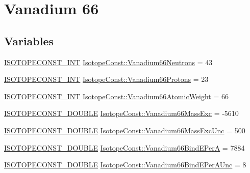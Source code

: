 \hypertarget{group___isotope_const-_vanadium-_v66}{}\section{Vanadium 66}
\label{group___isotope_const-_vanadium-_v66}
\subsection*{Variables}
\begin{DoxyCompactItemize}
\item 
\mbox{\hyperlink{group___isotope_const-_macros_ga5f18360b3e99483a35c32d789e62621c}{I\+S\+O\+T\+O\+P\+E\+C\+O\+N\+S\+T\+\_\+\+I\+NT}} \mbox{\hyperlink{group___isotope_const-_vanadium-_v66_ga191a0f33845293c272da14841b084d69}{Isotope\+Const\+::\+Vanadium66\+Neutrons}} = 43
\item 
\mbox{\hyperlink{group___isotope_const-_macros_ga5f18360b3e99483a35c32d789e62621c}{I\+S\+O\+T\+O\+P\+E\+C\+O\+N\+S\+T\+\_\+\+I\+NT}} \mbox{\hyperlink{group___isotope_const-_vanadium-_v66_ga18873adb59a7c3400b8dd6fa83fe769a}{Isotope\+Const\+::\+Vanadium66\+Protons}} = 23
\item 
\mbox{\hyperlink{group___isotope_const-_macros_ga5f18360b3e99483a35c32d789e62621c}{I\+S\+O\+T\+O\+P\+E\+C\+O\+N\+S\+T\+\_\+\+I\+NT}} \mbox{\hyperlink{group___isotope_const-_vanadium-_v66_ga159e5003c881723cec389aa0dbca0256}{Isotope\+Const\+::\+Vanadium66\+Atomic\+Weight}} = 66
\item 
\mbox{\hyperlink{group___isotope_const-_macros_ga8f45a7272ce02c0b4c65c44636ed719a}{I\+S\+O\+T\+O\+P\+E\+C\+O\+N\+S\+T\+\_\+\+D\+O\+U\+B\+LE}} \mbox{\hyperlink{group___isotope_const-_vanadium-_v66_ga17f347c21fdc927da5c9b33f49a1c058}{Isotope\+Const\+::\+Vanadium66\+Mass\+Exc}} = -\/5610
\item 
\mbox{\hyperlink{group___isotope_const-_macros_ga8f45a7272ce02c0b4c65c44636ed719a}{I\+S\+O\+T\+O\+P\+E\+C\+O\+N\+S\+T\+\_\+\+D\+O\+U\+B\+LE}} \mbox{\hyperlink{group___isotope_const-_vanadium-_v66_gaab204bb017b4d66e0c43c6588fad08dd}{Isotope\+Const\+::\+Vanadium66\+Mass\+Exc\+Unc}} = 500
\item 
\mbox{\hyperlink{group___isotope_const-_macros_ga8f45a7272ce02c0b4c65c44636ed719a}{I\+S\+O\+T\+O\+P\+E\+C\+O\+N\+S\+T\+\_\+\+D\+O\+U\+B\+LE}} \mbox{\hyperlink{group___isotope_const-_vanadium-_v66_gae288e9b0a815e5306c11dcb1ae05aaf0}{Isotope\+Const\+::\+Vanadium66\+Bind\+E\+PerA}} = 7884
\item 
\mbox{\hyperlink{group___isotope_const-_macros_ga8f45a7272ce02c0b4c65c44636ed719a}{I\+S\+O\+T\+O\+P\+E\+C\+O\+N\+S\+T\+\_\+\+D\+O\+U\+B\+LE}} \mbox{\hyperlink{group___isotope_const-_vanadium-_v66_gace5ad70d49eb0e9b8c016fc0d0663d6e}{Isotope\+Const\+::\+Vanadium66\+Bind\+E\+Per\+A\+Unc}} = 8

\end{DoxyCompactItemize}
